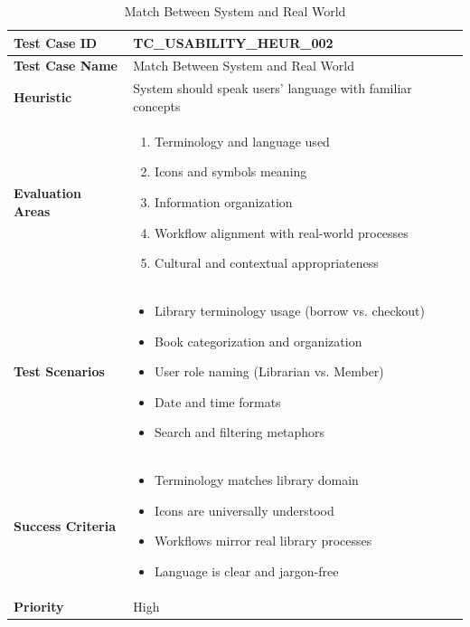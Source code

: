 \documentclass[12pt,a4paper]{article}
\begin{document}
\begin{longtable}{|p{3cm}|p{12cm}|}
\caption{Match Between System and Real World} \\
\hline
\rowcolor{lightgray}
\textbf{Test Case ID} & \textbf{TC\_USABILITY\_HEUR\_002} \\
\hline
\textbf{Test Case Name} & Match Between System and Real World \\
\hline
\textbf{Heuristic} & System should speak users' language with familiar concepts \\
\hline
\textbf{Evaluation Areas} & 
\begin{enumerate}[nosep]
    \item Terminology and language used
    \item Icons and symbols meaning
    \item Information organization
    \item Workflow alignment with real-world processes
    \item Cultural and contextual appropriateness
\end{enumerate} \\
\hline
\textbf{Test Scenarios} & 
\begin{itemize}[nosep]
    \item Library terminology usage (borrow vs. checkout)
    \item Book categorization and organization
    \item User role naming (Librarian vs. Member)
    \item Date and time formats
    \item Search and filtering metaphors
\end{itemize} \\
\hline
\textbf{Success Criteria} & 
\begin{itemize}[nosep]
    \item Terminology matches library domain
    \item Icons are universally understood
    \item Workflows mirror real library processes
    \item Language is clear and jargon-free
\end{itemize} \\
\hline
\textbf{Priority} & High \\
\hline
\end{longtable}
\end{document}
